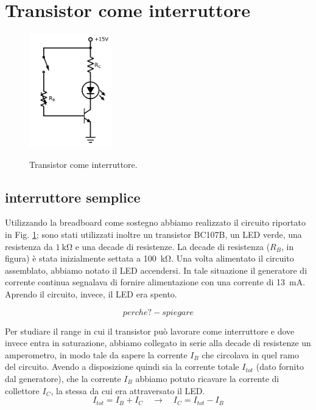 

\section{Transistor come interruttore}

\begin{figure}
	\caption{Transistor come interruttore.}
	\includegraphics[width=36mm]{cc1.pdf}
	\label{fig:cc1}
\end{figure}

\subsection{interruttore semplice}
Utilizzando la breadboard come sostegno abbiamo realizzato il circuito riportato in Fig. \ref{fig:cc1}; sono stati utilizzati inoltre un transistor BC107B, un LED verde, una resistenza da $\SI{1}{\kilo\ohm}$ e una decade di resistenze. La decade di resistenza ($R_B$, in figura) è stata inizialmente settata a \SI{100}{\kilo\ohm}.
Una volta alimentato il circuito assemblato, abbiamo notato il LED accendersi. In tale situazione il generatore di corrente continua segnalava di fornire alimentazione con una corrente di \SI{13}{\milli\ampere}. Aprendo il circuito, invece, il LED era spento.

$$perche? - spiegare$$

Per studiare il range in cui il transistor può lavorare come interruttore e dove invece entra in saturazione, abbiamo collegato in serie alla decade di resistenze un amperometro, in modo tale da sapere la corrente $I_B$ che circolava in quel ramo del circuito. Avendo a disposizione quindi sia la corrente totale $I_{tot}$ (dato fornito dal generatore), che la corrente $I_B$ abbiamo potuto ricavare la corrente di collettore $I_C$, la stessa da cui era attraversato il LED.
\begin{equation*}
	I_{tot} = I_B + I_C \quad \rightarrow \quad I_C = I_{tot} - I_B
\end{equation*}

